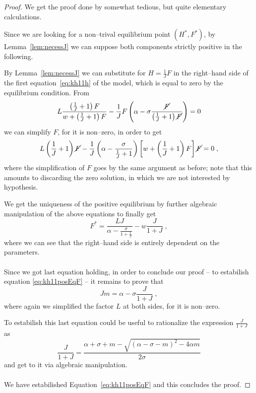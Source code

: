 \begin{proof}
    We get the proof done by somewhat tedious, but quite elementary calculations.

    Since we are looking for a non--trival equilibrium point $(H^*, F^*)$, by
    Lemma~\ref{lem:necessJ} we can suppose both components strictly positive in the following.

    By Lemma~\ref{lem:necessJ} we can substitute for $H=\frac{1}{J} F$ in the right--hand side of the first equation~\eqref{eq:kh11h} of the model, which is equal to zero by the equilibrium condition. From
    $$L \frac{ \left( \frac{1}{J} +1 \right) F }{ w +\left( \frac{1}{J} +1 \right) F }
    - \frac{1}{J} F \left( \alpha - \sigma \frac{\cancel{F}}{ \left( \frac{1}{J} +1 \right) \cancel{F} } \right) = 0$$
    we can simplify $F$, for it is non--zero, in order to get
    $$L \left( \frac{1}{J} +1 \right) \cancel{F} - \frac{1}{J} \left( \alpha - \frac{\sigma}{ \frac{1}{J} +1 } \right)
    \left[ w + \left( \frac{1}{J} +1 \right) F \right] \cancel{F} = 0 \; ,$$
    where the simplification of $F$ goes by the same argument as before; note that this amounts to discarding the zero solution, in which we are not interested by hypothesis.

    We get the uniqueness of the positive equilibrium by further algebraic manipulation of the above equations to finally get
    $$F^* = \frac{LJ}{ \alpha - \frac{\sigma}{ 1 + \frac{1}{J} } } - w \frac{J}{1+J} \; ,$$
    where we can see that the right--hand side is entirely dependent on the parameters.

    \paragraph{}
    Since we got last equation holding, in order to conclude our proof --
    \ie to estabilish equation \eqref{eq:kh11posEqF} -- it remains to prove that
    $$J m = \alpha - \sigma \frac{J}{1+J} \; ,$$
    where again we simplified the factor $L$ at both sides, for it is non--zero.

    To estabilish this last equation could be useful to rationalize the expression $\frac{J}{1+J}$ as
    $$\frac{J}{1+J} = \frac{ \alpha + \sigma + m - \sqrt{ {(\alpha - \sigma -m)}^2 - 4 \alpha m } }{2 \sigma}$$
    and get to it via algebraic manipulation.

    \paragraph{}
    We have estabilished Equation~\eqref{eq:kh11posEqF} and this concludes the proof.
\end{proof}


